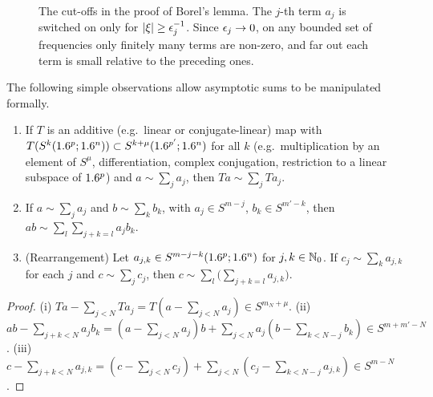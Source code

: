 \begin{figure}[htbp]
\centering
{}
\caption{The cut-offs in the proof of Borel's lemma. The $j$-th term $a_j$ is switched on
only for $\lvert \xi\rvert\ge\epsilon_j^{-1}$. Since $\epsilon_j\to0$, on any bounded set of frequencies
only finitely many terms are non-zero, and far out each term is small relative to the
preceding ones.}
\label{euclidean:fig:borel}
\end{figure}

The following simple observations allow asymptotic sums to be manipulated
formally.

\begin{lemma}\label{euclidean:lem:asymptotic-manip}
  \begin{enumerate}[label=\textup{(\roman*)}]
  \item If $T$ is an additive \textup{(}e.g.\ linear or conjugate-linear\textup{)} map
    with $T(S^{k}(1.6^p;1.6^n))\subset S^{k+\mu}(1.6^{p'};1.6^{n})$ for all
    $k$ \textup{(}e.g.\ multiplication by an element of $S^\mu$,
    differentiation, complex conjugation, restriction to a linear subspace of
    $1.6^p$\textup{)} and $a\sim\sum_ja_j$, then $Ta\sim\sum_jTa_j$.
  \item If $a\sim\sum_ja_j$ and $b\sim\sum_kb_k$, with $a_j\in S^{m-j}$,
    $b_k\in S^{m'-k}$, then $ab\sim\sum_l\sum_{j+k=l}a_jb_k$.
  \item \textup{(Rearrangement)} Let $a_{j,k}\in S^{m-j-k}(1.6^p;1.6^n)$ for
    $j,k\in\mathbb{N}_0$. If $c_j\sim\sum_ka_{j,k}$ for each $j$ and
    $c\sim\sum_jc_j$, then $c\sim\sum_l\bigl(\sum_{j+k=l}a_{j,k}\bigr)$.
  \end{enumerate}
\end{lemma}
\begin{proof}
  (i) $Ta-\sum_{j<N}Ta_j=T(a-\sum_{j<N}a_j)\in S^{m_N+\mu}$.
  (ii) $ab-\sum_{j+k<N}a_jb_k=(a-\sum_{j<N}a_j)b+\sum_{j<N}a_j(b-\sum_{k<N-j}b_k)
  \in S^{m+m'-N}$.
  (iii) $c-\sum_{j+k<N}a_{j,k}=(c-\sum_{j<N}c_j)+\sum_{j<N}(c_j-\sum_{k<N-j}a_{j,k})
  \in S^{m-N}$.
\end{proof}

